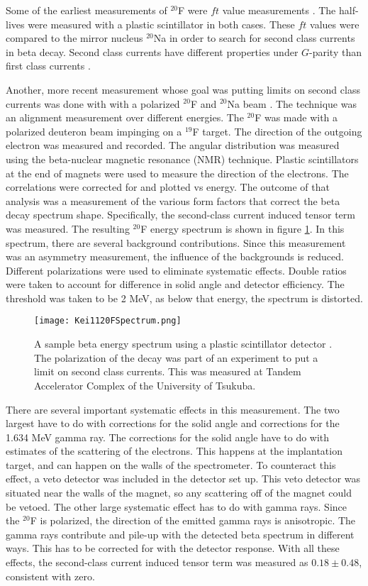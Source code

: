 \documentclass[../MaxHughesThesis.tex]{subfiles}
\begin{document}
Some of the earliest measurements of $^{20}$F were $ft$ value measurements \cite{Wil70} \cite{Alb75}.
The half-lives were measured with a plastic scintillator in both cases.  
These $ft$ values were compared to the mirror nucleus $^{20}$Na in order to search for second class currents in beta decay.
Second class currents have different properties under $G$-parity than first class currents \cite{Wei58}.

Another, more recent measurement whose goal was putting limits on second class currents was done with with a polarized $^{20}$F and $^{20}$Na beam \cite{Min11}.
The technique was an alignment measurement over different energies.
The $^{20}$F was made with a polarized deuteron beam impinging on a $^{19}$F target. 
The direction of the outgoing electron was measured and recorded.
The angular distribution was measured using the beta-nuclear magnetic resonance (NMR) technique.
Plastic scintillators at the end of magnets were used to measure the direction of the electrons.
The correlations were corrected for and plotted vs energy.
The outcome of that analysis was a measurement of the various form factors that correct the beta decay spectrum shape. 
Specifically, the second-class current induced tensor term was measured.
The resulting $^{20}$F energy spectrum is shown in figure \ref{fig:keispec}.
In this spectrum, there are several background contributions. 
Since this measurement  was an asymmetry measurement, the influence of the backgrounds is reduced. 
Different polarizations were used to eliminate systematic effects.
Double ratios were taken to account for difference in solid angle and detector efficiency.
The threshold was taken to be 2 MeV, as below that energy, the spectrum is distorted.

\begin{figure}[!htb]
	\centerline{\texttt{[image: Kei1120FSpectrum.png]}}
	\caption{A sample beta energy spectrum using a plastic scintillator detector \cite{Min11}.
		 The polarization of the decay was part of an experiment to put a limit on second class currents.
		 This was measured at Tandem Accelerator Complex of the University of Tsukuba.
		 } 
	\label{fig:keispec}
\end{figure}

There are several important systematic effects in this measurement.
The two largest have to do with corrections for the solid angle and corrections for the 1.634 MeV gamma ray.
The corrections for the solid angle have to do with estimates of the scattering of the electrons.
This happens at the implantation target, and can happen on the walls of the spectrometer.
To counteract this effect, a veto detector was included in the detector set up. 
This veto detector was situated near the walls of the magnet, so any scattering off of the magnet could be vetoed. 
The other large systematic effect has to do with gamma rays.
Since the $^{20}$F is polarized, the direction of the emitted gamma rays is anisotropic.
The gamma rays contribute and pile-up with the detected beta spectrum in different ways.
This has to be corrected for with the detector response.
With all these effects, the second-class current induced tensor term was measured as $0.18 \pm 0.48$, consistent with zero. 
\end{document}
